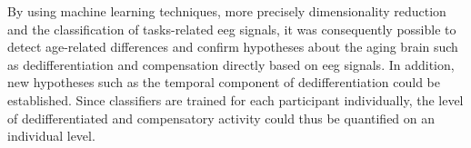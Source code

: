 By using machine learning techniques, more precisely dimensionality reduction and the classification of tasks-related \gls{eeg} signals, it was consequently possible to detect age-related differences and confirm hypotheses about the aging brain such as dedifferentiation and compensation directly based on \gls{eeg} signals. In addition, new hypotheses such as the temporal component of dedifferentiation could be established.  Since classifiers are trained for each participant individually, the level of dedifferentiated and compensatory activity could thus be quantified on an individual level.
